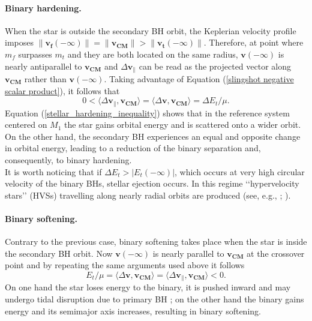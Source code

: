 \documentclass[12pt,twoside,openany]{book}
\begin{document}
\paragraph{Binary hardening.}
When the star is outside the secondary BH orbit, the Keplerian velocity profile imposes $\|\mathbf{v_f}(-\infty) \| =\| \mathbf{v_{CM}}\| > \|\mathbf{v_t}(-\infty) \|$. Therefore, at point where $m_f$ surpasses $m_t$ and they are both located on the same radius, $\mathbf{v}(-\infty)$ is nearly antiparallel to $\mathbf{v_{CM}}$ and $\Delta\mathbf{v}_\parallel$ can be read as the projected vector along $\mathbf{v_{CM}}$ rather than $\mathbf{v}(-\infty)$. Taking advantage of Equation (\ref{slingshot negative scalar product}), it follows that
\begin{equation}
\label{stellar_hardening_inequality}
    0<\langle \Delta\mathbf{v}_\parallel, \mathbf{v_{CM}} \rangle=\langle \Delta\mathbf{v}, \mathbf{v_{CM}}\rangle=\Delta E_t/\mu.
\end{equation}
Equation (\ref{stellar_hardening_inequality}) shows that in the reference system centered on $M_1$ the star gains orbital energy and is scattered onto a wider orbit. On the other hand, the secondary BH experiences an equal and opposite change in orbital energy, leading to a reduction of the binary separation and, consequently, to binary hardening.\\It is worth noticing that if $\Delta E_t>|E_t(-\infty)|$, which occurs at very high circular velocity of the binary BHs, stellar ejection occurs. In this regime ‘‘hypervelocity stars’’ (HVSs) travelling along nearly radial orbits are produced (see, e.g., \citealt{Quinlan_1996}; \citealt{Sesana_2006}).

\paragraph{Binary softening.}
Contrary to the previous case, binary softening takes place when the star is inside the secondary BH orbit. Now $\mathbf{v}(-\infty)$ is nearly parallel to $\mathbf{v_{CM}}$ at the crossover point and by repeating the same arguments used above it follows
\begin{equation}
     E_t/\mu=\langle \Delta\mathbf{v}, \mathbf{v_{CM}}\rangle=\langle \Delta\mathbf{v}_\parallel, \mathbf{v_{CM}} \rangle<0.
\end{equation}
On one hand the star loses energy to the binary, it is pushed inward and may undergo tidal disruption due to primary BH \parencite{Lightman_1977}; on the other hand the binary gains energy and its semimajor axis increases, resulting in binary softening.
\end{document}
